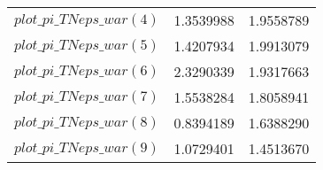 \begin{center}
\begin{longtable}{lcc}
$plot\_pi\_TN eps\_war (4)   $	 & 	      1.3539988	 & 	      1.9558789 \\ 
$plot\_pi\_TN eps\_war (5)   $	 & 	      1.4207934	 & 	      1.9913079 \\ 
$plot\_pi\_TN eps\_war (6)   $	 & 	      2.3290339	 & 	      1.9317663 \\ 
$plot\_pi\_TN eps\_war (7)   $	 & 	      1.5538284	 & 	      1.8058941 \\ 
$plot\_pi\_TN eps\_war (8)   $	 & 	      0.8394189	 & 	      1.6388290 \\ 
$plot\_pi\_TN eps\_war (9)   $	 & 	      1.0729401	 & 	      1.4513670 \\ 
\end{longtable}
 \end{center}
